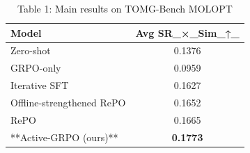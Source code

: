 \begin{table}[t]
\centering
\caption{Table 1: Main results on TOMG-Bench MOLOPT}
\label{tab:2607.00531}
\begin{tabular}{lc}
\toprule
Model & Avg SR\_×\_Sim\_↑\_ \\
\midrule
Zero-shot & 0.1376 \\
GRPO-only & 0.0959 \\
Iterative SFT & 0.1627 \\
Offline-strengthened RePO & 0.1652 \\
RePO & 0.1665 \\
**Active-GRPO (ours)** & \textbf{0.1773} \\
\bottomrule
\end{tabular}
\end{table}
